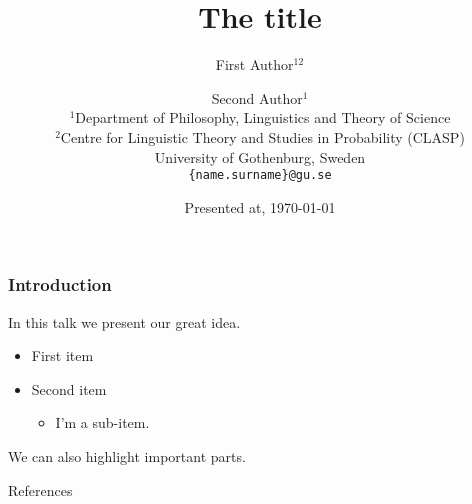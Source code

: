 \documentclass[aspectratio=1610]{beamer} %
\title{\color{blue} The title}
\author{First Author$^{12}$ \and Second Author$^{1}$ \\
        $^{1}$Department of Philosophy, Linguistics and Theory of Science \\ 
        $^{2}$Centre for Linguistic Theory and Studies in Probability (CLASP) \\
        University of Gothenburg, Sweden \\
      \texttt{\{name.surname\}@gu.se}}
\date{Presented at, \today}
\newcommand{\highlight}[1]{{\color{blue}#1}}
\begin{document}
\frame[plain]{\titlepage}










\begin{frame}

\frametitle{Introduction}

In this talk we present our great idea.

\begin{itemize}
  
\item First item

\item Second item
  \begin{itemize}

  \item I'm a sub-item.

  \end{itemize}

\end{itemize}

\bigskip

We can also highlight \highlight{important parts}.


\end{frame}






\begin{frame}[allowframebreaks]{References}

\small






\end{frame}
\end{document}
